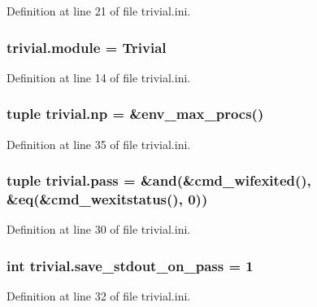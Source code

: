 Definition at line 21 of file trivial.\-ini.

\hypertarget{namespacetrivial_a3e713ea5d6e77bf165eeaafc02275430}{
\subsubsection[{module}]{\setlength{\rightskip}{0pt plus 5cm}trivial.\-module = Trivial}}\label{namespacetrivial_a3e713ea5d6e77bf165eeaafc02275430}


Definition at line 14 of file trivial.\-ini.

\hypertarget{namespacetrivial_adfe4da0e2d8f3078b198c0f76ee394dd}{
\subsubsection[{np}]{\setlength{\rightskip}{0pt plus 5cm}tuple trivial.\-np = \&env\-\_\-max\-\_\-procs()}}\label{namespacetrivial_adfe4da0e2d8f3078b198c0f76ee394dd}


Definition at line 35 of file trivial.\-ini.

\hypertarget{namespacetrivial_a65b4003f52ce4fa5d324695f54c1e3b3}{
\subsubsection[{pass}]{\setlength{\rightskip}{0pt plus 5cm}tuple trivial.\-pass = \&and(\&cmd\-\_\-wifexited(), \&eq(\&cmd\-\_\-wexitstatus(), 0))}}\label{namespacetrivial_a65b4003f52ce4fa5d324695f54c1e3b3}


Definition at line 30 of file trivial.\-ini.

\hypertarget{namespacetrivial_aefbe39eb9fcb8a58d4e04dd980e35062}{
\subsubsection[{save\-\_\-stdout\-\_\-on\-\_\-pass}]{\setlength{\rightskip}{0pt plus 5cm}int trivial.\-save\-\_\-stdout\-\_\-on\-\_\-pass = 1}}\label{namespacetrivial_aefbe39eb9fcb8a58d4e04dd980e35062}


Definition at line 32 of file trivial.\-ini.

